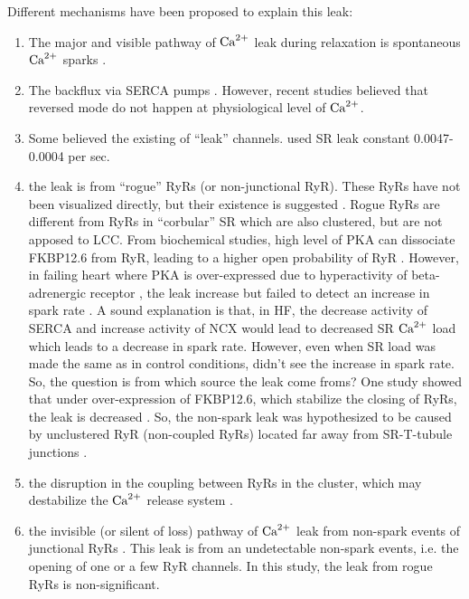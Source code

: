 Different mechanisms have been proposed to explain this leak:
\begin{enumerate}
  \item The major and visible pathway of ${\text{Ca}^{2+}}$ leak during relaxation is
  spontaneous ${\text{Ca}^{2+}}$ sparks \citep{bers2001ecc}.
    
  \item The backflux via SERCA pumps \citep{shannon1998, shannon2000rms}.
  However, recent studies believed that reversed mode do not happen at
  physiological level of ${\text{Ca}^{2+}}$. 
  
  \item Some believed the existing of ``leak'' channels\citep{camello2002,
  shannon2000rms}. \citep{shannon2000rms} used SR leak constant 0.0047-0.0004
  per sec. 
   
  \item the leak is from ``rogue'' RyRs (or non-junctional RyR). These RyRs have
  not been visualized directly, but their existence is suggested
  \citep{lipp2002}. Rogue RyRs are different from RyRs in ``corbular'' SR which
  are also clustered, but are not apposed to LCC. From biochemical studies, high
  level of PKA can dissociate FKBP12.6 from RyR, leading to a higher open
  probability of RyR \citep{marks2002, marx2000}. However, in failing heart
  where PKA is over-expressed due to hyperactivity of beta-adrenergic receptor
  \citep{ono2000}, the leak increase but failed to detect  an increase in spark
  rate \citep{gomez1997}. A sound explanation is that, in HF, the decrease
  activity of SERCA and increase activity of NCX would lead to decreased SR
  ${\text{Ca}^{2+}}$ load which leads to a decrease in spark rate. However, even when SR load
  was made the same as in control conditions, \citep{li2002} didn't see the
  increase in spark rate. So, the question is from which source the leak come
  froms? One study showed that under over-expression of FKBP12.6, which
  stabilize the closing of RyRs, the leak is decreased \citep{prestle2001}. So,
  the non-spark leak was hypothesized  to be caused by unclustered RyR
  (non-coupled RyRs) located far away from SR-T-tubule junctions
  \citep{sobie2006}.

  \item the disruption in the coupling between RyRs in the cluster, which may
  destabilize the ${\text{Ca}^{2+}}$ release system \citep{sobie2006}.
  
  \item the invisible (or silent of loss) pathway of ${\text{Ca}^{2+}}$ leak from non-spark
  events of junctional RyRs \citep{williams2011}. This leak is from an
  undetectable non-spark events, i.e. the opening of one or a few RyR channels.
  In this study, the leak from rogue RyRs is non-significant.
  
  
\end{enumerate}

